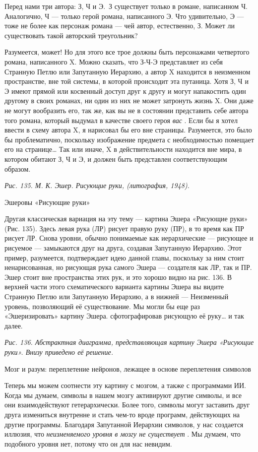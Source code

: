 \documentclass[../main.tex]{subfiles}
\begin{document}
Перед нами три автора: З, Ч и Э.~З существует только в романе, написанном Ч. Аналогично, Ч --- только герой романа, написанного Э. Что удивительно, Э --- тоже не более как персонаж романа --- чей автор, естественно, З. Может ли существовать такой авторский треугольник?

Разумеется, может! Но для этого все трое должны быть персонажами четвертого романа, написанного X. Можно сказать, что З-Ч-Э представляет из себя Странную Петлю или Запутанную Иерархию, а автор X находится в неизменном пространстве, вне той системы, в которой происходит эта путаница. Хотя З, Ч и Э имеют прямой или косвенный доступ друг к другу и могут напакостить один другому в своих романах, ни один из них не может затронуть жизнь X. Они даже не могут вообразить его, так же, как вы не в состоянии представить себе автора того романа, который выдумал в качестве своего героя \emph{вас} . Если бы я хотел ввести в схему автора X, я нарисовал бы его вне страницы. Разумеется, это было бы проблематично, поскольку изображение предмета с необходимостью помещает его на странице\ldots{} Так или иначе, X в действительности находится вне мира, в котором обитают З, Ч и Э, и должен быть представлен соответствующим образом.

\emph{Рис. 135. М. К. Эшер. Рисующие руки, (литография, 1948).}

Эшеровы «Рисующие руки»

Другая классическая вариация на эту тему --- картина Эшера «Рисующие руки» (Рис. 135). Здесь левая рука (ЛР) рисует правую руку (ПР), в то время как ПР рисует ЛР. Снова уровни, обычно понимаемые как иерархические --- рисующее и рисуемое --- замыкаются друг на друга, создавая Запутанную Иерархию. Этот пример, разумеется, подтверждает идею данной главы, поскольку за ним стоит ненарисованная, но рисующая рука самого Эшера --- создателя как ЛР, так и ПР. Эшер стоит вне пространства этих рук, и это хорошо видно на рис. 136. В верхней части этого схематического варианта картины Эшера вы видите Странную Петлю или Запутанную Иерархию, а в нижней --- Неизменный уровень, позволяющий её существование. Мы могли бы еще раз «Эшеризировать» картину Эшера. сфотографировав рисующую её руку\ldots{} и так далее.

\emph{Рис. 136. Абстрактная диаграмма, представляющая картину Эшера «Рисующие руки». Внизу приведено её решение.}

Мозг и разум: переплетение нейронов, лежащее в основе переплетения символов

Теперь мы можем соотнести эту картину с мозгом, а также с программами ИИ\@. Когда мы думаем, символы в нашем мозгу активируют другие символы, и все они взаимодействуют гетерархически. Более того, символы могут заставить друг друга измениться внутренне и стать чем-то вроде программ, действующих на другие программы. Благодаря Запутанной Иерархии символов, у нас создается иллюзия, что \emph{неизменяемого уровня в мозгу не существует} . Мы думаем, что подобного уровня нет, потому что он для нас невидим.
\end{document}
